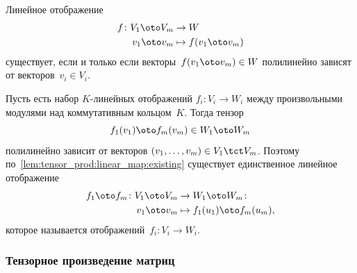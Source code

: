 \begin{lemma}
	\label{lem:tensor_prod:linear_map:existing}
	Линейное отображение
	\begin{align*}
		f \colon
		V_1 \oto V_m
		&\to
		W
		\\
		v_1 \oto v_m
		&\mapsto
		f(v_1 \oto v_m)
	\end{align*}
	существует, если и только если векторы~$f(v_1 \oto v_m) \in W$ полилинейно зависят от векторов~$v_i \in V_i$.
\end{lemma}

Пусть есть набор $K$-линейных отображений $f_i \colon V_i \to W_i$ между произвольными модулями над коммутативным кольцом~$K$. Тогда тензор
\[
	f_1(v_1) \oto f_m(v_m)
	\in
	W_1 \oto W_m
\]
полилинейно зависит от векторов
$
	(v_1, \dots, v_m)
	\in
	V_1 \tct V_m
$.
Поэтому по~\cref{lem:tensor_prod:linear_map:existing} существует единственное линейное отображение
\begin{align*}
	f_1 \oto f_m
	\colon
	V_1 \oto V_m
	&\to
	W_1 \oto W_m
	\colon
	\\
	v_1 \oto v_m
	&\mapsto
	f_1(u_1)
	\oto
	f_m(u_m)
	,
\end{align*}
которое называется  отображений~$f_i \colon V_i \to W_i$.

\subsubsection{Тензорное произведение матриц}

